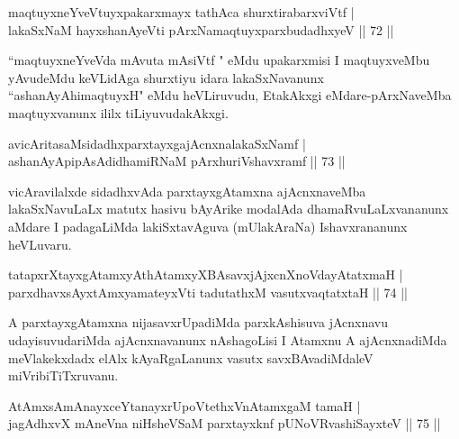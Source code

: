 
\begin{shl}
maqtuyxneYveVtuyxpakarxmayx tathAca shurxtirabarxviVtf |\\
lakaSxNaM hayxshanAyeVti pArxNamaqtuyxparxbudadhxyeV \hfill || 72 ||
\end{shl}

\begin{artha}
``maqtuyxneYveVda mAvuta mAsiVtf " eMdu upakarxmisi I maqtuyxveMbu yAvudeMdu keVLidAga shurxtiyu idara lakaSxNavanunx ``ashanAyAhimaqtuyxH" eMdu heVLiruvudu, EtakAkxgi eMdare-pArxNaveMba maqtuyxvanunx ililx tiLiyuvudakAkxgi.
\end{artha}


\begin{shl}
avicAritasaMsidadhxparxtayxgajAcnxnalakaSxNamf |\\
ashanAyApipAsAdidhamiRNaM pArxhuriVshavxramf \hfill || 73 ||
\end{shl}

\begin{artha}
vicAravilalxde sidadhxvAda parxtayxgAtamxna ajAcnxnaveMba lakaSxNavuLaLx matutx hasivu bAyArike modalAda dhamaRvuLaLxvananunx aMdare I padagaLiMda lakiSxtavAguva (mUlakAraNa) Ishavxrananunx heVLuvaru.
\end{artha}

\begin{shl}
tatapxrXtayxgAtamxyAthAtamxyXBAsavxjAjxcnXnoVdayAtatxmaH |\\
parxdhavxsAyx\s \s tAmx\s yamateyxVti tadutathxM vasutxvaqtatxtaH \hfill || 74 ||
\end{shl}

\begin{artha}
A parxtayxgAtamxna nijasavxrUpadiMda parxkAshisuva jAcnxnavu udayisuvudariMda ajAcnxnavanunx nAshagoLisi I Atamxnu A ajAcnxnadiMda meVlakekxdadx elAlx kAyaRgaLanunx vasutx savxBAvadiMdaleV miVribiTiTxruvanu.
\end{artha}


\begin{shl}
AtAmx\s sAmAnayxceYtanayxrUpoVtethxVnA\s \s tamxgaM tamaH |\\
jagAdhxvX mAneVna niHsheVSaM parxtayxknf pUNoVR\s vashiSayxteV \hfill || 75 ||
\end{shl}


